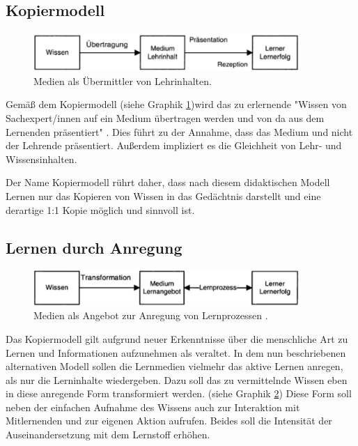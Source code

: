 \subsection{Kopiermodell}
\label{sub:Kopiermodell}
\begin{figure}[h]
	\centering
	\includegraphics[width=0.9\textwidth]{Abbildungen/Kerres2001_Kopiermodell.PNG}
	\caption{Medien als Übermittler von Lehrinhalten. \cite[S. 146]{Kerres.2001}}
	\label{fig:Kerres2001_Kopiermodell}
\end{figure}
Gemäß dem Kopiermodell (siehe Graphik \ref{fig:Kerres2001_Kopiermodell})wird das zu erlernende "Wissen von Sachexpert/innen auf ein Medium übertragen werden und von da aus dem Lernenden präsentiert" \cite[S. 146]{Kerres.2001}. Dies führt zu der Annahme, dass das Medium und nicht der Lehrende präsentiert. Außerdem impliziert es die Gleichheit von Lehr- und Wissensinhalten.

Der Name Kopiermodell rührt daher, dass nach diesem didaktischen Modell Lernen nur das Kopieren von Wissen in das Gedächtnis darstellt und eine derartige 1:1 Kopie möglich und sinnvoll ist. \cite[S. 145 - 146]{Kerres.2001}

\subsection{Lernen durch Anregung}
\label{sub:LernenDurchAnregung}
\begin{figure}[h]
	\centering
	\includegraphics[width=0.9\textwidth]{Abbildungen/Kerres2001_LernenDurchAnregung.PNG}
	\caption{Medien als Angebot zur Anregung von Lernprozessen . \cite[S. 147]{Kerres.2001}}
	\label{fig:Kerres2001_LernenDurchAnregung}
\end{figure}
Das Kopiermodell gilt aufgrund neuer Erkenntnisse über die menschliche Art zu Lernen und Informationen aufzunehmen als veraltet.
In dem nun beschriebenen alternativen Modell sollen die Lernmedien vielmehr das aktive Lernen anregen, als nur die Lerninhalte wiedergeben. 
Dazu soll das zu vermittelnde Wissen eben in diese anregende Form transformiert werden. (siehe Graphik \ref{fig:Kerres2001_LernenDurchAnregung}) Diese Form soll neben der einfachen Aufnahme des Wissens auch zur Interaktion mit Mitlernenden und zur eigenen Aktion aufrufen. Beides soll die Intensität der Auseinandersetzung mit dem Lernstoff erhöhen. \cite[S. 147 - 148]{Kerres.2001}